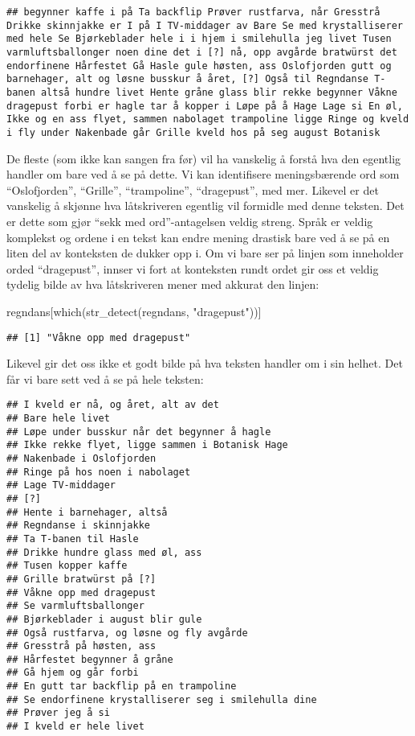 \documentclass[
]{article}
\newenvironment{Shaded}{\begin{snugshade}}{\end{snugshade}}
\newcommand{\FunctionTok}[1]{\textcolor[rgb]{0.00,0.00,0.00}{#1}}
\newcommand{\NormalTok}[1]{#1}
\newcommand{\StringTok}[1]{\textcolor[rgb]{0.31,0.60,0.02}{#1}}
\begin{document}
\begin{verbatim}
## begynner kaffe i på Ta backflip Prøver rustfarva, når Gresstrå Drikke skinnjakke er I på I TV-middager av Bare Se med krystalliserer mеd hele Se Bjørkeblader hele i i hjem i smilehulla jeg livet Tusen varmluftsballonger noen dine det i [?] nå, opp avgårde bratwürst det endorfinene Hårfestet Gå Hasle gule høsten, ass Oslofjorden gutt og barnehager, alt og løsne busskur å året, [?] Også til Regndanse T-banen altså hundre livet Hente gråne glass blir rekke begynner Våkne dragepust forbi er hagle tar å koppеr i Løpe på å Hage Lage si En øl, Ikke og en ass flyet, sammen nabolaget trampoline ligge Ringe og kveld i fly under Nakenbade går Grille kveld hos på seg august Botanisk
\end{verbatim}

De fleste (som ikke kan sangen fra før) vil ha vanskelig å forstå hva
den egentlig handler om bare ved å se på dette. Vi kan identifisere
meningsbærende ord som ``Oslofjorden'', ``Grille'', ``trampoline'',
``dragepust'', med mer. Likevel er det vanskelig å skjønne hva
låtskriveren egentlig vil formidle med denne teksten. Det er dette som
gjør ``sekk med ord''-antagelsen veldig streng. Språk er veldig
komplekst og ordene i en tekst kan endre mening drastisk bare ved å se
på en liten del av konteksten de dukker opp i. Om vi bare ser på linjen
som inneholder orded ``dragepust'', innser vi fort at konteksten rundt
ordet gir oss et veldig tydelig bilde av hva låtskriveren mener med
akkurat den linjen:

\begin{Shaded}
\begin{Highlighting}[]
\NormalTok{regndans[}\FunctionTok{which}\NormalTok{(}\FunctionTok{str\_detect}\NormalTok{(regndans, }\StringTok{"dragepust"}\NormalTok{))]}
\end{Highlighting}
\end{Shaded}

\begin{verbatim}
## [1] "Våkne opp mеd dragepust"
\end{verbatim}

Likevel gir det oss ikke et godt bilde på hva teksten handler om i sin
helhet. Det får vi bare sett ved å se på hele teksten:

\begin{verbatim}
## I kveld er nå, og året, alt av det
## Bare hele livet
## Løpe under busskur når det begynner å hagle
## Ikke rekke flyet, ligge sammen i Botanisk Hage
## Nakenbade i Oslofjorden
## Ringe på hos noen i nabolaget
## Lage TV-middager
## [?]
## Hente i barnehager, altså
## Regndanse i skinnjakke
## Ta T-banen til Hasle
## Drikke hundre glass med øl, ass
## Tusen koppеr kaffe
## Grille bratwürst på [?]
## Våkne opp mеd dragepust
## Se varmluftsballonger
## Bjørkeblader i august blir gule
## Også rustfarva, og løsne og fly avgårde
## Gresstrå på høsten, ass
## Hårfestet begynner å gråne
## Gå hjem og går forbi
## En gutt tar backflip på en trampoline
## Se endorfinene krystalliserer seg i smilehulla dine
## Prøver jeg å si
## I kveld er hele livet
\end{verbatim}
\end{document}
